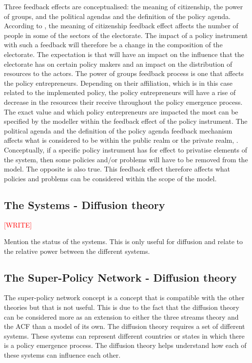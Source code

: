 Three feedback effects are conceptualised: the meaning of citizenship, the power of groups, and the political agendas and the definition of the policy agenda. According to \cite{mettler2014policy}, the meaning of citizenship feedback effect affects the number of people in some of the sectors of the electorate. The impact of a policy instrument with such a feedback will therefore be a change in the composition of the electorate. The expectation is that will have an impact on the influence that the electorate has on certain policy makers and an impact on the distribution of resources to the actors. The power of groups feedback process is one that affects the policy entrepreneurs. Depending on their affiliation, which is in this case related to the implemented policy, the policy entrepreneurs will have a rise of decrease in the resources their receive throughout the policy emergence process. The exact value and which policy entrepreneurs are impacted the most can be specified by the modeller within the feedback effect of the policy instrument. The political agenda and the definition of the policy agenda feedback mechanism affects what is considered to be within the public realm or the private realm, \cite{mettler2014policy}. Conceptually, if a specific policy instrument has for effect to privatise elements of the system, then some policies and/or problems will have to be removed from the model. The opposite is also true. This feedback effect therefore affects what policies and problems can be considered within the scope of the model.

%
\subsection{The Systems - Diffusion theory}
\label{ssec:SystemsDiffusion}

\textcolor{red}{[WRITE]}

Mention the status of the systems. This is only useful for diffusion and relate to the relative power between the different systems.

%
\subsection{The Super-Policy Network - Diffusion theory}
\label{ssec:superPolicyNetworkDiffusion}

The super-policy network concept is a concept that is compatible with the other theories but that is not useful. This is due to the fact that the diffusion theory can be considered more as an extension to either the three streams theory and the ACF than a model of its own. The diffusion theory requires a set of different systems. These systems can represent different countries or states in which there is a policy emergence process. The diffusion theory helps understand how each of these systems can influence each other.

